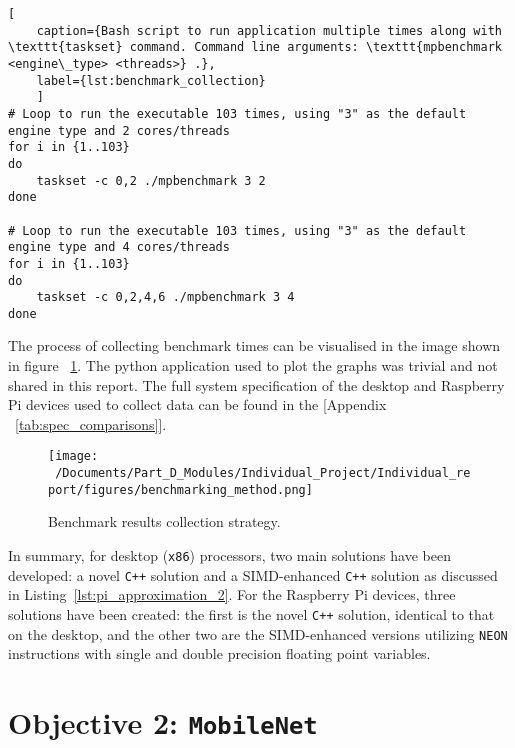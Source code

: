 \begin{lstlisting}[
	caption={Bash script to run application multiple times along with \texttt{taskset} command. Command line arguments: \texttt{mpbenchmark <engine\_type> <threads>} .},
	label={lst:benchmark_collection}
	]
# Loop to run the executable 103 times, using "3" as the default engine type and 2 cores/threads 
for i in {1..103}
do
	taskset -c 0,2 ./mpbenchmark 3 2 
done

# Loop to run the executable 103 times, using "3" as the default engine type and 4 cores/threads 
for i in {1..103}
do
	taskset -c 0,2,4,6 ./mpbenchmark 3 4 
done
\end{lstlisting}

The process of collecting benchmark times can be visualised in the image shown in figure ~\ref{fig:results_collection}. The python application used to plot the graphs was trivial and not shared in this report. The full system specification of the desktop and Raspberry Pi devices used to collect data can be found in the [Appendix ~\ref{tab:spec_comparisons}].

\begin{figure}[H] %
	\centering
	\texttt{[image: ~/Documents/Part\_D\_Modules/Individual\_Project/Individual\_report/figures/benchmarking\_method.png]} %
	\caption{Benchmark results collection strategy.}
	\label{fig:results_collection} %
\end{figure}

In summary, for desktop (\texttt{x86}) processors, two main solutions have been developed: a novel \texttt{C++} solution and a SIMD-enhanced \texttt{C++} solution as discussed in Listing~\ref{lst:pi_approximation_2}. For the Raspberry Pi devices, three solutions have been created: the first is the novel \texttt{C++} solution, identical to that on the desktop, and the other two are the SIMD-enhanced versions utilizing \texttt{NEON} instructions with single and double precision floating point variables.

\section{Objective 2: \texttt{MobileNet}}

